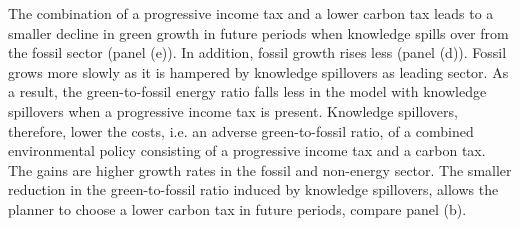 
 

The combination of a progressive income tax and a lower carbon tax leads to a smaller decline in green growth in future periods when knowledge spills over from the fossil sector (panel (e)). In addition, fossil growth rises less (panel (d)). Fossil grows more slowly as it is hampered by knowledge spillovers as leading sector. As a result, the green-to-fossil energy ratio falls less in the model with knowledge spillovers when a progressive income tax is present. Knowledge spillovers, therefore, lower the costs, i.e. an adverse green-to-fossil ratio, of a combined environmental policy consisting of a progressive income tax and a carbon tax. The gains are higher growth rates in the fossil and non-energy sector.
The smaller reduction in the green-to-fossil ratio induced by knowledge spillovers, allows the planner to choose a lower carbon tax in future periods, compare panel (b).

